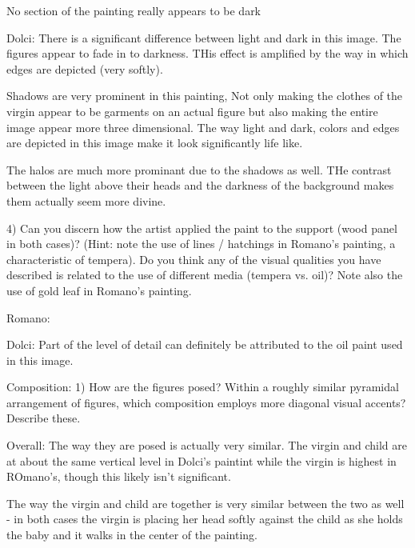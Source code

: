             No section of the painting really appears to be dark

        Dolci:
            There is a significant difference between light and dark in this
            image.  The figures appear to fade in to darkness.  THis effect is
            amplified by the way in which edges are depicted (very softly).

            Shadows are very prominent in this painting, Not only making the
            clothes of the virgin appear to be garments on an actual figure but
            also making the entire image appear more three dimensional.  The
            way light and dark, colors and edges are depicted in this image
            make it look significantly life like.

            The halos are much more prominant due to the shadows as well.  THe
            contrast between the light above their heads and the darkness of
            the background makes them actually seem more divine.

    4)  Can you discern how the artist applied the paint to the support (wood
        panel in both cases)?  (Hint:  note the use of lines / hatchings in
        Romano’s painting, a characteristic of tempera).   Do you think any of
        the visual qualities you have described is related to the use of
        different media (tempera vs. oil)?  Note also the use of gold leaf in
        Romano’s painting.

        Romano:

        Dolci:
            Part of the level of detail can definitely be attributed to the oil
            paint used in this image.





Composition:
    1)  How are the figures posed?  Within a roughly similar pyramidal
        arrangement of figures, which composition employs more diagonal visual
        accents?  Describe these.

        Overall:
            The way they are posed is actually very similar.  The virgin and
            child are at about the same vertical level in Dolci's paintint
            while the virgin is highest in ROmano's, though this likely isn't
            significant.

            The way the virgin and child are together is very similar between
            the two as well - in both cases the virgin is placing her head
            softly against the child as she holds the baby and it walks in the
            center of the painting.

